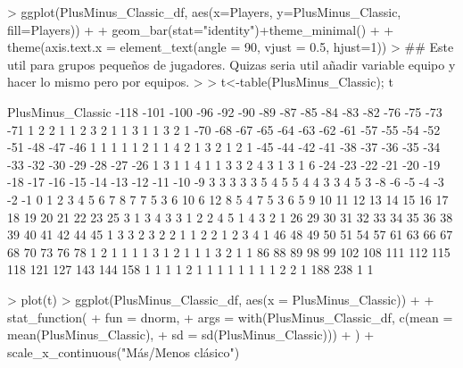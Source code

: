 \documentclass[paper=a4, fontsize=9pt]{article}
\begin{document}
\begin{Schunk}
\begin{Sinput}
> ggplot(PlusMinus_Classic_df, aes(x=Players, y=PlusMinus_Classic, fill=Players)) +
+   geom_bar(stat="identity")+theme_minimal() + 
+   theme(axis.text.x = element_text(angle = 90, vjust = 0.5, hjust=1))
> ## Este util para grupos pequeños de jugadores. Quizas seria util añadir variable equipo y hacer lo mismo pero por equipos.
> 
> t<-table(PlusMinus_Classic); t
\end{Sinput}
\begin{Soutput}
PlusMinus_Classic
-118 -101 -100  -96  -92  -90  -89  -87  -85  -84  -83  -82  -76  -75  -73  -71 
   1    2    2    1    1    2    3    2    1    1    3    1    1    3    2    1 
 -70  -68  -67  -65  -64  -63  -62  -61  -57  -55  -54  -52  -51  -48  -47  -46 
   1    1    1    1    1    2    1    1    4    2    1    3    2    1    2    1 
 -45  -44  -42  -41  -38  -37  -36  -35  -34  -33  -32  -30  -29  -28  -27  -26 
   1    3    1    1    4    1    1    3    3    2    4    3    1    3    1    6 
 -24  -23  -22  -21  -20  -19  -18  -17  -16  -15  -14  -13  -12  -11  -10   -9 
   3    3    3    3    3    5    4    5    5    4    4    3    3    4    5    3 
  -8   -6   -5   -4   -3   -2   -1    0    1    2    3    4    5    6    7    8 
   7    7    5    3    6   10    6   12    8    5    4    7    5    3    6    5 
   9   10   11   12   13   14   15   16   17   18   19   20   21   22   23   25 
   3    1    3    4    3    3    1    2    2    4    5    1    4    3    2    1 
  26   29   30   31   32   33   34   35   36   38   39   40   41   42   44   45 
   1    3    3    2    3    2    2    1    1    2    2    1    2    3    4    1 
  46   48   49   50   51   54   57   61   63   66   67   68   70   73   76   78 
   1    2    1    1    1    1    3    1    2    1    1    1    3    2    1    1 
  86   88   89   98   99  102  108  111  112  115  118  121  127  143  144  158 
   1    1    1    1    2    1    1    1    1    1    1    1    1    2    2    1 
 188  238 
   1    1 
\end{Soutput}
\begin{Sinput}
> plot(t)
> ggplot(PlusMinus_Classic_df, aes(x = PlusMinus_Classic)) +
+   stat_function(
+     fun = dnorm, 
+     args = with(PlusMinus_Classic_df, c(mean = mean(PlusMinus_Classic), 
+                                       sd = sd(PlusMinus_Classic)))
+   ) + scale_x_continuous("Más/Menos clásico")
\end{Sinput}
\end{Schunk}
\end{document}
